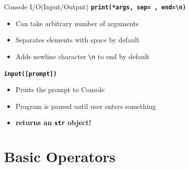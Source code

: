         \begin{frame}{Console I/O(Input/Output)}
            \huge
            \textbf{\texttt{print(*args, sep=\textquotesingle \ \textquotesingle, end=\textquotesingle \textbackslash n\textquotesingle )}}
            \begin{itemize}
                \LARGE
                \item Can take arbitrary number of arguments
                \item Separates elements with space by default
                \item Adds newline character \texttt{\textquotesingle \textbackslash n\textquotesingle} to end by default
            \end{itemize}
            \textbf{\texttt{input([prompt])}}
            \begin{itemize}
                \LARGE
                \item Prints the prompt to Console
                \item Program is paused until user enters something
                \item \textbf{returns an \texttt{str} object!} 
            \end{itemize}
        \end{frame}

    \section{Basic Operators}
        
